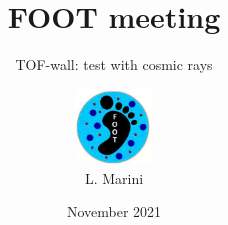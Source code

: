 \title[FOOT meeting]{FOOT meeting}
\subtitle[]{TOF-wall: test with cosmic rays}
\author[The author]{\includegraphics[height=2cm,width=2cm]{figures/logo.jpeg}\\L. Marini}
\date[November 2021]{November 2021}
